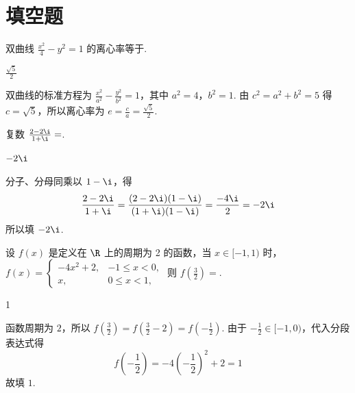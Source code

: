 \section{填空题}

\begin{problem}
双曲线 \(\frac{x^{2}}{4} - y^{2} = 1\) 的离心率等于\fillinblank{}.
\begin{answer}
\(\frac{\sqrt{5}}{2}\)
\end{answer}

\begin{solution}
双曲线的标准方程为 \(\frac{x^2}{a^2}-\frac{y^2}{b^2}=1\)，其中 \(a^2=4\)，\(b^2=1\). 由 \(c^2=a^2+b^2=5\) 得 \(c=\sqrt5\)，所以离心率为 \(e=\frac{c}{a}=\frac{\sqrt5}{2}\).
\end{solution}
\end{problem}

\begin{problem}
复数 \(\frac{2 - 2\i}{1 + \i} =\)\fillinblank{}.
\begin{answer}
\(-2\i\)
\end{answer}

\begin{solution}
分子、分母同乘以 \(1-\i\)，得
\[
\frac{2-2\i}{1+\i}=\frac{(2-2\i)(1-\i)}{(1+\i)(1-\i)}=\frac{-4\i}{2}=-2\i
\]
所以填 \(-2\i\).
\end{solution}
\end{problem}

\begin{problem}
设 \(f(x)\) 是定义在 \(\R\) 上的周期为 2 的函数，当 \(x \in [-1,1)\) 时，\(f(x) = \begin{cases}
-4x^{2} + 2, & -1 \leqslant x < 0,\\
    x, & 0 \leqslant x < 1,
\end{cases}\) 则 \(f\left(\frac{3}{2}\right) =\)\fillinblank{}.
\begin{answer}
1
\end{answer}

\begin{solution}
函数周期为 \(2\)，所以 \(f\left(\frac32\right)=f\left(\frac32-2\right)=f\left(-\frac12\right)\). 由于 \(-\frac12\in[-1,0)\)，代入分段表达式得
\[
f\left(-\frac12\right)=-4\left(-\frac12\right)^2+2=1
\]
故填 \(1\).
\end{solution}
\end{problem}

